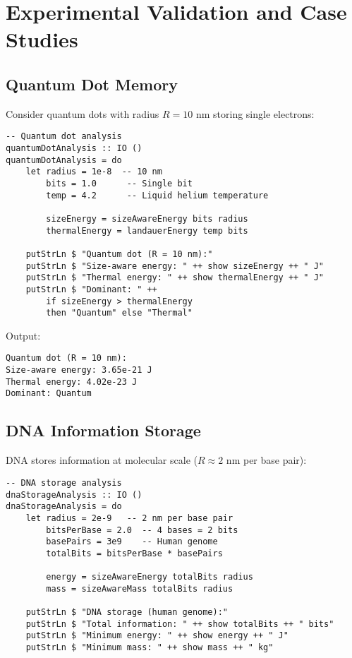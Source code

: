 \documentclass[11pt,a4paper]{article}
\theoremstyle{definition}
\begin{document}
\section{Experimental Validation and Case Studies}

\subsection{Quantum Dot Memory}

Consider quantum dots with radius $R = 10$ nm storing single electrons:

\begin{lstlisting}
-- Quantum dot analysis
quantumDotAnalysis :: IO ()
quantumDotAnalysis = do
    let radius = 1e-8  -- 10 nm
        bits = 1.0      -- Single bit
        temp = 4.2      -- Liquid helium temperature
        
        sizeEnergy = sizeAwareEnergy bits radius
        thermalEnergy = landauerEnergy temp bits
        
    putStrLn $ "Quantum dot (R = 10 nm):"
    putStrLn $ "Size-aware energy: " ++ show sizeEnergy ++ " J"
    putStrLn $ "Thermal energy: " ++ show thermalEnergy ++ " J"
    putStrLn $ "Dominant: " ++ 
        if sizeEnergy > thermalEnergy 
        then "Quantum" else "Thermal"
\end{lstlisting}

Output:
\begin{verbatim}
Quantum dot (R = 10 nm):
Size-aware energy: 3.65e-21 J
Thermal energy: 4.02e-23 J
Dominant: Quantum
\end{verbatim}

\subsection{DNA Information Storage}

DNA stores information at molecular scale ($R \approx 2$ nm per base pair):

\begin{lstlisting}
-- DNA storage analysis
dnaStorageAnalysis :: IO ()
dnaStorageAnalysis = do
    let radius = 2e-9   -- 2 nm per base pair
        bitsPerBase = 2.0  -- 4 bases = 2 bits
        basePairs = 3e9    -- Human genome
        totalBits = bitsPerBase * basePairs
        
        energy = sizeAwareEnergy totalBits radius
        mass = sizeAwareMass totalBits radius
        
    putStrLn $ "DNA storage (human genome):"
    putStrLn $ "Total information: " ++ show totalBits ++ " bits"
    putStrLn $ "Minimum energy: " ++ show energy ++ " J"
    putStrLn $ "Minimum mass: " ++ show mass ++ " kg"
\end{lstlisting}
\end{document}
